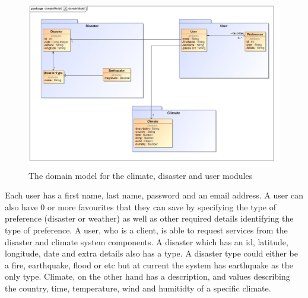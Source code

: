 \begin{figure}[H]
	\centering
	\includegraphics[scale=0.17]{../images/funcReq/domainModel.jpg}
	\caption{The domain model for the climate, disaster and user modules \label{overflow}}
\end{figure} Each user has a first name, last name, password and an email address. A user can also have 0 or more favourites that they can save by specifying the type of preference (disaster or weather) as well as other required details identifying the type of preference. A user, who is a client, is able to request services from the disaster and climate system components. A disaster which has an id, latitude, longitude, date and extra details also has a type. A disaster type could either be a fire, earthquake, flood or etc but at current the system has earthquake as the only type. Climate, on the other hand has a description, and values describing the country, time, temperature, wind and humitidty of a specific climate.